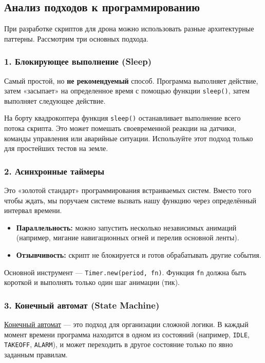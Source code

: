 \subsection{Анализ подходов к программированию}

При разработке скриптов для дрона можно использовать разные архитектурные паттерны. Рассмотрим три основных подхода.

\subsubsection{1. Блокирующее выполнение (Sleep)}
Самый простой, но \textbf{не рекомендуемый} способ. Программа выполняет действие, затем «засыпает» на определенное время с помощью функции \texttt{sleep()}, затем выполняет следующее действие.

\begin{warnbox}
На борту квадрокоптера функция \texttt{sleep()} останавливает выполнение всего потока скрипта. Это может помешать своевременной реакции на датчики, команды управления или аварийные ситуации. Используйте этот подход только для простейших тестов на земле.
\end{warnbox}

\subsubsection{2. Асинхронные таймеры}
Это «золотой стандарт» программирования встраиваемых систем. Вместо того чтобы ждать, мы поручаем системе вызвать нашу функцию через определённый интервал времени.

\begin{infobox}
\begin{itemize}
    \item \textbf{Параллельность:} можно запустить несколько независимых анимаций (например, мигание навигационных огней и перелив основной ленты).
    \item \textbf{Отзывчивость:} скрипт не блокируется и готов обрабатывать другие события.
\end{itemize}
\end{infobox}

Основной инструмент — \texttt{Timer.new(period, fn)}. Функция \texttt{fn} должна быть короткой и выполнять только один шаг анимации (тик).

\subsubsection{3. Конечный автомат (State Machine)}
\hyperlink{term:automaton}{Конечный автомат} — это подход для организации сложной логики. В каждый момент времени программа находится в одном из состояний (например, \texttt{IDLE}, \texttt{TAKEOFF}, \texttt{ALARM}), и может переходить в другое состояние только по явно заданным правилам.

